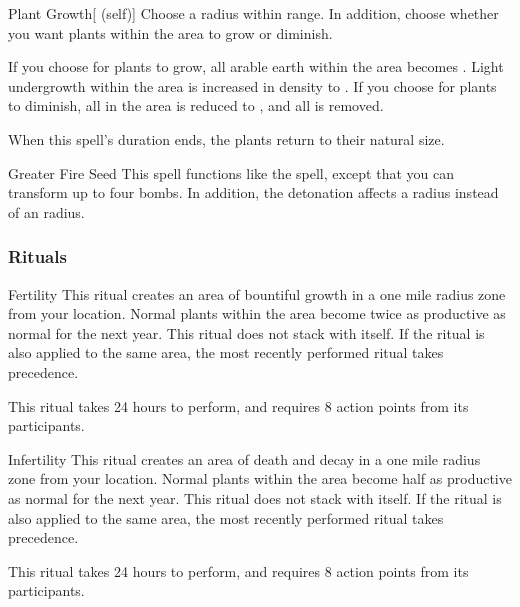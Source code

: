 \begin{ability}[\nth{2}]{Plant Growth}[ (self)]
Choose a \arealarge radius within \rnglong range.
In addition, choose whether you want plants within the area to grow or diminish.

If you choose for plants to grow, all arable earth within the area becomes .
Light undergrowth within the area is increased in density to .
If you choose for plants to diminish, all  in the area is reduced to , and all  is removed.

When this spell's duration ends, the plants return to their natural size.
\end{ability}
\vspace{0.25em}



\begin{ability}[\nth{4}]{Greater Fire Seed}
This spell functions like the  spell, except that you can transform up to four bombs.
In addition, the detonation affects a \areamed radius instead of an \areasmall radius.
\end{ability}
\vspace{0.25em}



\subsubsection{Rituals}


\begin{ability}[\nth{2}]{Fertility}
This ritual creates an area of bountiful growth in a one mile radius zone from your location.
Normal plants within the area become twice as productive as normal for the next year.
This ritual does not stack with itself.
If the  ritual is also applied to the same area, the most recently performed ritual takes precedence.

This ritual takes 24 hours to perform, and requires 8 action points from its participants.
\end{ability}
\vspace{0.25em}



\begin{ability}[\nth{2}]{Infertility}
This ritual creates an area of death and decay in a one mile radius zone from your location.
Normal plants within the area become half as productive as normal for the next year.
This ritual does not stack with itself.
If the  ritual is also applied to the same area, the most recently performed ritual takes precedence.

This ritual takes 24 hours to perform, and requires 8 action points from its participants.
\end{ability}
\vspace{0.25em}



